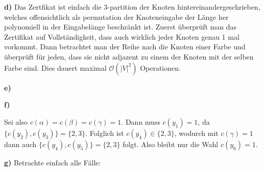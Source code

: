 \documentclass[a4paper,graphics,11pt]{article}
\begin{document}
\textbf{d)}
Das Zertfikat ist einfach die 3-partition der Knoten hintereinandergeschrieben, welches offensichtlich als
permutation der Knoteneingabe der Länge her polynomiell in der Eingabelänge beschränkt ist.
Zuerst überprüft man das Zertifikat auf Vollständigkeit, dass auch wirklich jeder Knoten genau 1 mal vorkommt.
Dann betrachtet man der Reihe nach die Knoten einer Farbe und überprüft für jeden, dass sie nicht adjazent zu einem
der Knoten mit der selben Farbe sind. Dies dauert maximal $\mathcal{O}(|V|^2)$ Operationen.

\textbf{e)}

\begin{center}
\end{center}

\textbf{f)}

Sei also $c(\alpha) = c(\beta) = c(\gamma) = 1$. Dann muss $c(y_1) = 1$, da $\{c(y_2), c(y_3)\} = \{2,3\}$.
Folglich ist $c(y_4) \in \{2,3\}$, wodurch mit $c(\gamma) = 1$ dann auch $\{c(y_4), c(y_5)\} = \{2,3\}$ folgt.
Also bleibt nur die Wahl $c(y_6) = 1$.

\newpage

\textbf{g)}
Betrachte einfach alle Fälle:
\end{document}
